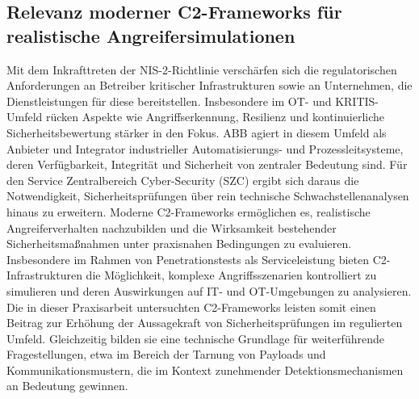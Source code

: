 \subsection{Relevanz moderner C2-Frameworks für realistische Angreifersimulationen}
Mit dem Inkrafttreten der NIS-2-Richtlinie verschärfen sich die regulatorischen Anforderungen an Betreiber kritischer Infrastrukturen sowie an Unternehmen, die Dienstleistungen für diese bereitstellen. 
Insbesondere im OT- und KRITIS-Umfeld rücken Aspekte wie Angriffserkennung, Resilienz und kontinuierliche Sicherheitsbewertung stärker in den Fokus. 
ABB agiert in diesem Umfeld als Anbieter und Integrator industrieller Automatisierungs- und Prozessleitsysteme, deren Verfügbarkeit, Integrität und Sicherheit von zentraler Bedeutung sind.
\newline\newline
Für den Service Zentralbereich Cyber-Security (SZC) ergibt sich daraus die Notwendigkeit, Sicherheitsprüfungen über rein technische Schwachstellenanalysen hinaus zu erweitern. 
Moderne C2-Frameworks ermöglichen es, realistische Angreiferverhalten nachzubilden und die Wirksamkeit bestehender Sicherheitsmaßnahmen unter praxisnahen Bedingungen zu evaluieren. 
Insbesondere im Rahmen von Penetrationstests als Serviceleistung bieten C2-Infrastrukturen die Möglichkeit, komplexe Angriffsszenarien kontrolliert zu simulieren und deren Auswirkungen auf IT- und OT-Umgebungen zu analysieren.
\newline\newline
Die in dieser Praxisarbeit untersuchten C2-Frameworks leisten somit einen Beitrag zur Erhöhung der Aussagekraft von Sicherheitsprüfungen im regulierten Umfeld. 
Gleichzeitig bilden sie eine technische Grundlage für weiterführende Fragestellungen, etwa im Bereich der Tarnung von Payloads und Kommunikationsmustern, die im Kontext zunehmender Detektionsmechanismen an Bedeutung gewinnen.
